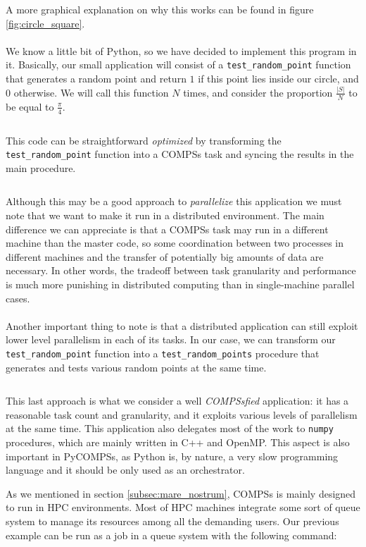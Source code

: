 A more graphical explanation on why this works can be found in figure \ref{fig:circle_square}.\\
\\
We know a little bit of Python, so we have decided to implement this program in it. Basically, our small application will consist of a \verb|test_random_point| function that generates a random point and return $1$ if this point lies inside our circle, and $0$ otherwise. We will call this function $N$ times, and consider the proportion $\frac{|S|}{N}$ to be equal to $\frac{\pi}{4}$.
\inputminted{python}{applications/PI_SQUARE/sequential.py}
This code can be straightforward \textit{optimized} by transforming the \verb|test_random_point| function into a COMPSs task and syncing the results in the main procedure.
\inputminted{python}{applications/PI_SQUARE/pycompss_naive.py}
Although this may be a good approach to \textit{parallelize} this application we must note that we want to make it run in a distributed environment. The main difference we can appreciate is that a COMPSs task may run in a different machine than the master code, so some coordination between two processes in different machines and the transfer of potentially big amounts of data are necessary. In other words, the tradeoff between task granularity and performance is much more punishing in distributed computing than in single-machine parallel cases.\\
\\
Another important thing to note is that a distributed application can still exploit lower level parallelism in each of its tasks. In our case, we can transform our \verb|test_random_point| function into a \verb|test_random_points| procedure that generates and tests various random points at the same time.

\inputminted{python}{applications/PI_SQUARE/pycompss_vectorized.py}

This last approach is what we consider a well \textit{COMPSsfied} application: it has a reasonable task count and granularity, and it exploits various levels of parallelism at the same time. This application also delegates most of the work to \verb|numpy| procedures, which are mainly written in C++ and OpenMP. This aspect is also important in PyCOMPSs, as Python is, by nature, a very slow programming language and it should be only used as an orchestrator.

As we mentioned in section \ref{subsec:mare_nostrum}, COMPSs is mainly designed to run in HPC environments. Most of HPC machines integrate some sort of queue system to manage its resources among all the demanding users. Our previous example can be run as a job in a queue system with the following command:

